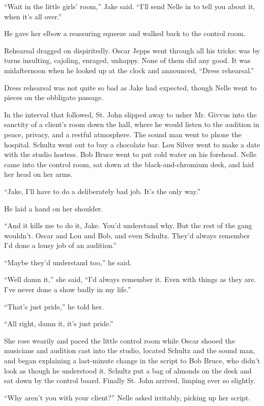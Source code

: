\documentclass{novel}
\begin{document}
“Wait in the little girls’ room,” Jake said. “I’ll send Nelle in to tell you about it, when it’s all over.”

He gave her elbow a reassuring squeeze and walked back to the control room.

Rehearsal dragged on dispiritedly. Oscar Jepps went through all his tricks: was by turns insulting, cajoling, enraged, unhappy. None of them did any good. It was midafternoon when he looked up at the clock and announced, “Dress rehearsal.”

Dress rehearsal was not quite so bad as Jake had expected, though Nelle went to pieces on the obbligato passage.

In the interval that followed, St. John slipped away to usher Mr. Givvus into the sanctity of a client’s room down the hall, where he would listen to the audition in peace, privacy, and a restful atmosphere. The sound man went to phone the hospital. Schultz went out to buy a chocolate bar. Lou Silver went to make a date with the studio hostess. Bob Bruce went to put cold water on his forehead. Nelle came into the control room, sat down at the black-and-chromium desk, and laid her head on her arms.

“Jake, I'll have to do a deliberately bad job. It’s the only way.”

He laid a hand on her shoulder.

“And it kills me to do it, Jake. You’d understand why. But the rest of the gang wouldn’t. Oscar and Lou and Bob, and even Schultz. They’d always remember I’d done a lousy job of an audition.”

“Maybe they’d understand too,” he said.

“Well damn it,” she said, “I’d always remember it. Even with things as they are. I’ve never done a show badly in my life.”

“That’s just pride,” he told her.

“All right, damn it, it’s just pride.”

She rose wearily and paced the little control room while Oscar shooed the musicians and audition cast into the studio, located Schultz and the sound man, and began explaining a last-minute change in the script to Bob Bruce, who didn’t look as though he understood it. Schultz put a bag of almonds on the desk and sat down by the control board. Finally St. John arrived, limping ever so slightly.

“Why aren’t you with your client?” Nelle asked irritably, picking up her script.
\end{document}
